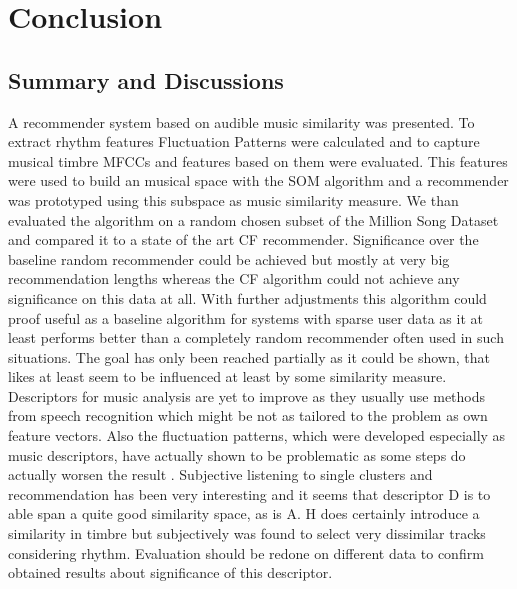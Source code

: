 \documentclass[cic,tc,english]{iiufrgs}
\begin{document}
\chapter{Conclusion}

\section{Summary and Discussions}
A recommender system based on audible music similarity was presented. To extract rhythm features Fluctuation Patterns were calculated and to capture musical timbre MFCCs and features based on them were evaluated. This features were used to build an musical space with the SOM algorithm and a recommender was prototyped using this subspace as music similarity measure. We than evaluated the algorithm on a random chosen subset of the Million Song Dataset and compared it to a state of the art CF recommender. Significance over the baseline random recommender could be achieved but mostly at very big recommendation lengths whereas the CF algorithm could not achieve any significance on this data at all. With further adjustments this algorithm could proof useful as a baseline algorithm for systems with sparse user data as it at least performs better than a completely random recommender often used in such situations. The goal has only been reached partially as it could be shown, that likes at least seem to be influenced at least by some similarity measure. Descriptors for music analysis are yet to improve as they usually use methods from speech recognition which might be not as tailored to the problem as own feature vectors. Also the fluctuation patterns, which were developed especially as music descriptors, have actually shown to be problematic as some steps do actually worsen the result \cite{lidy2005evaluation}. Subjective listening to single clusters and recommendation has been very interesting and it seems that descriptor D is to able span a quite good similarity space, as is A. H does certainly introduce a similarity in timbre but subjectively was found to select very dissimilar tracks considering rhythm. Evaluation should be redone on different data to confirm obtained results about significance of this descriptor. 
\end{document}
